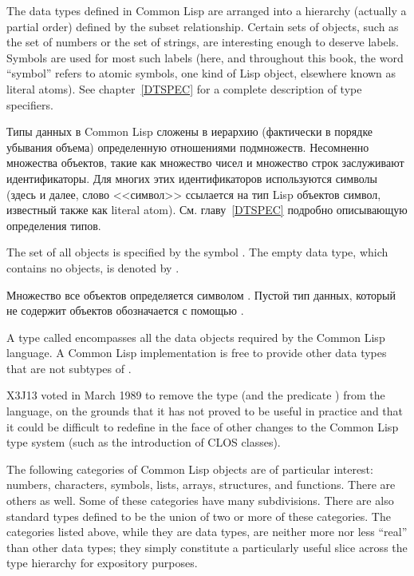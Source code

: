 The data types defined in Common Lisp are arranged into a hierarchy (actually
a partial order) defined by the subset relationship.
Certain sets of objects, such as the set of numbers or the
set of strings, are interesting enough to deserve labels.
Symbols are used for most
such labels (here, and throughout this book, the word ``symbol''
refers to atomic symbols, one kind of Lisp object,
elsewhere known as literal atoms).  See chapter~\ref{DTSPEC}
for a complete description of type specifiers.

Типы данных в Common Lisp сложены в иерархию (фактически в порядке
убывания объема) определенную отношениями подмножеств. Несомненно
множества объектов, такие как множество чисел и множество строк
заслуживают идентификаторы. Для многих этих идентификаторов
используются символы (здесь и далее, слово <<символ>> ссылается на
тип Lisp объектов символ, известный также как literal
atom). См. главу~\ref{DTSPEC} подробно описывающую определения
типов. 

The set of all objects is specified
by the symbol {\true}.  The empty data type, which contains no objects, is
denoted by {\nil}.

Множество все объектов определяется символом {\true}. Пустой тип
данных, который не содержит объектов обозначается с помощью
{\nil}. 

\begin{obsolete}
A type called  encompasses all the data
objects required by the Common Lisp language.  A Common Lisp implementation
is free to provide other data types that are not subtypes of .
\end{obsolete}

\begin{newer}
X3J13 voted in March 1989
to remove the type  (and the predicate )
from the language, on the grounds that it has
not proved to be useful in practice and that it could be difficult to redefine in the
face of other changes to the Common Lisp type system (such as the introduction
of CLOS classes).
\end{newer}

The following categories of Common Lisp objects are of particular interest:
numbers, characters, symbols, lists, arrays, structures, and functions.
There are others as well.
Some of these categories
have many subdivisions.  There are also standard types defined to
be the union
of two or more of these categories.  The categories listed above, while they
are data types, are neither more nor less ``real'' than other data types;
they simply constitute a particularly useful slice across
the type hierarchy for expository purposes.

